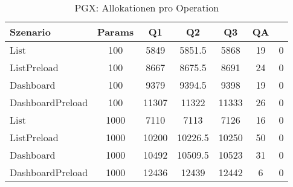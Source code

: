 \begin{table}[ht]
\centering
\caption{PGX: Allokationen pro Operation}
\begin{tabular}{lccccc}
\toprule
Szenario & Params & Q1 & Q2 & Q3 & QA \\
\midrule
	List & 100 & 5849 & 5851.5 & 5868 & 19 & 0 \\
	ListPreload & 100 & 8667 & 8675.5 & 8691 & 24 & 0 \\
	Dashboard & 100 & 9379 & 9394.5 & 9398 & 19 & 0 \\
	DashboardPreload & 100 & 11307 & 11322 & 11333 & 26 & 0 \\
	List & 1000 & 7110 & 7113 & 7126 & 16 & 0 \\
	ListPreload & 1000 & 10200 & 10226.5 & 10250 & 50 & 0 \\
	Dashboard & 1000 & 10492 & 10509.5 & 10523 & 31 & 0 \\
	DashboardPreload & 1000 & 12436 & 12439 & 12442 & 6 & 0 \\
\bottomrule
\end{tabular}
\label{tab:benchmark_pgx_allocsperop}
\end{table}
	